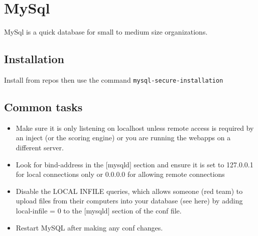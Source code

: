 \section{MySql}

MySql is a quick database for small to medium size organizations.

\subsection{Installation}

Install from repos then use the command \lstinline|mysql-secure-installation|

\subsection{Common tasks}


\begin{itemize}
	\item Make sure it is only listening on localhost unless remote access is required by an inject (or the scoring engine) or you are running the webapps on a different server.
	\item Look for bind-address in the [mysqld] section and ensure it is set to 127.0.0.1 for local connections only or 0.0.0.0 for allowing remote connections
	\item Disable the LOCAL INFILE queries, which allows someone (red team) to upload files from their computers into your database (see here) by adding local-infile = 0 to the [mysqld] section of the conf file.
	\item Restart MySQL after making any conf changes.
\end{itemize}
